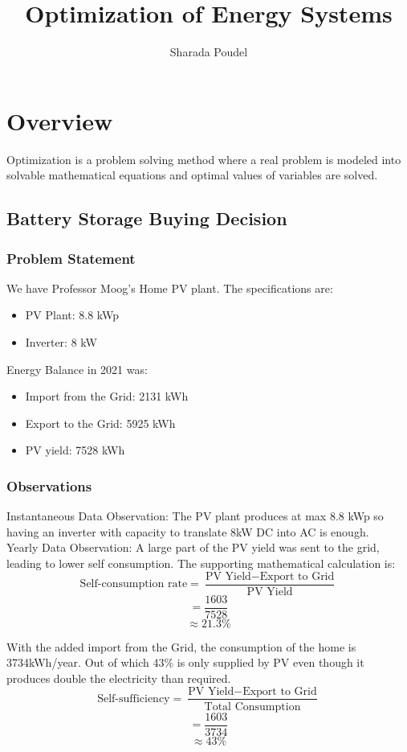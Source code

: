\documentclass[oneside]{book}
\title{Optimization of Energy Systems}
\author{Sharada Poudel}
\begin{document}
\maketitle
\tableofcontents
\chapter{Overview}
Optimization is a problem solving method where a real problem is modeled into solvable mathematical equations and optimal values of variables are solved. 

\section{Battery Storage Buying Decision}

\subsection{Problem Statement}
We have Professor Moog's Home PV plant. The specifications are:
\begin{itemize}
\item PV Plant: 8.8 kWp
\item Inverter: 8 kW
\end{itemize}

Energy Balance in 2021 was:
\begin{itemize}
\item Import from the Grid: 2131 kWh
\item Export to the Grid: 5925 kWh
\item PV yield: 7528 kWh
\end{itemize}
\subsection{Observations}
Instantaneous Data Observation: The PV plant produces at max 8.8 kWp so having an inverter with capacity to translate 8kW DC into AC is enough. \\
Yearly Data Observation: A large part of the PV yield was sent to the grid, leading to lower self consumption. 
The supporting mathematical calculation is:
\[\text{Self-consumption rate}= \frac{\text{PV Yield} - \text{Export to Grid}}{\text{PV Yield}}\]
\[=\frac{1603}{7528}\]
\[\approx 21.3\%\]

With the added import from the Grid, the consumption of the home is 3734kWh/year. Out of which 43\% is only supplied by PV even though it produces double the electricity than required. 
\[\text{Self-sufficiency}= \frac{\text{PV Yield} - \text{Export to Grid}}{\text{Total Consumption}}\]
\[=\frac{1603}{3734}\]
\[\approx 43\%\]
\end{document}
